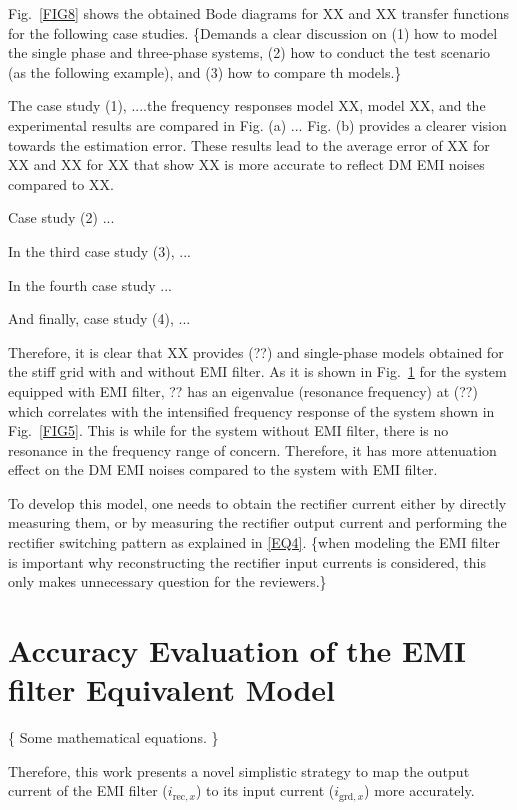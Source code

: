 \documentclass[journal,a4paper,10pt,twoside]{IEEEtran} %
\begin{document}
    
    
    
    
    Fig.~\ref{FIG8} shows the obtained Bode diagrams for XX and XX transfer functions for the following case studies. {\color{red} \{Demands a clear discussion on (1) how to model the single phase and three-phase systems, (2) how to conduct the test scenario (as the following example), and (3) how to compare th models.\}}
	
	
	The case study (1), ....the frequency responses model XX, model XX, and the experimental results are compared in Fig. (a) ... Fig. (b) provides a clearer vision towards the estimation error. These results lead to the average error of XX for XX and XX for XX that show XX is more accurate to reflect DM EMI noises compared to XX.
	
	Case study (2) ...
	
	In the third case study (3), ...
	
	In the fourth case study ...
	
	And finally, case study (4), ...
	
	Therefore, it is clear that XX provides 
	(??) and single-phase models obtained for the stiff grid with and without EMI filter. As it is shown in Fig.~\ref{} for the system equipped with EMI filter, ?? has an eigenvalue (resonance frequency) at (??) which correlates with the intensified frequency response of the system shown in Fig.~\ref{FIG5}. This is while for the system without EMI filter, there is no resonance in the frequency range of concern. Therefore, it has more attenuation effect on the DM EMI noises compared to the system with EMI filter. 
	
	To develop this model, one needs to obtain the rectifier current either by directly measuring them, or by measuring the rectifier output current and performing the rectifier switching pattern as explained in \eqref{EQ4}. {\color{red} \{when modeling the EMI filter is important why reconstructing the rectifier input currents is considered, this only makes unnecessary question for the reviewers.\}}
	
	\section{Accuracy Evaluation of the EMI filter Equivalent Model}
	
	{\color{blue} \{ Some mathematical equations. \}} 
	
	
	
	Therefore, this work presents a novel simplistic strategy to map the output current of the EMI filter ($i_{\mathrm{rec},x}$) to its input current ($i_{\mathrm{grd},x}$) more accurately.
	
\end{document}
